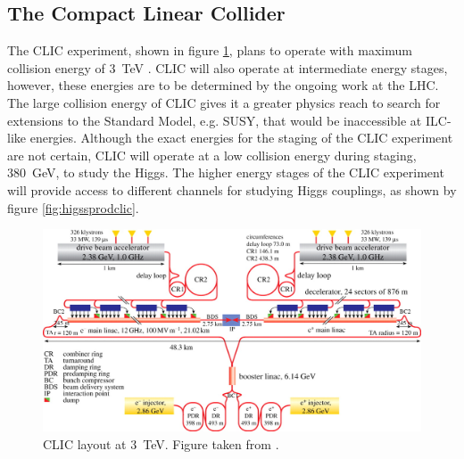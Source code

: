 
\subsection{The Compact Linear Collider}
The CLIC experiment, shown in figure \ref{fig:clic}, plans to operate with maximum collision energy of 3~TeV \cite{Linssen:2012hp, CLIC:2016zwp}.  CLIC will also operate at intermediate energy stages, however, these energies are to be determined by the ongoing work at the LHC.  The large collision energy of CLIC gives it a greater physics reach to search for extensions to the Standard Model, e.g. SUSY, that would be inaccessible at ILC-like energies.  Although the exact energies for the staging of the CLIC experiment are not certain, CLIC will operate at a low collision energy during staging, 380~GeV, to study the Higgs.  The higher energy stages of the CLIC experiment will provide access to different channels for studying Higgs couplings, as shown by figure \ref{fig:higssprodclic}.

\begin{figure}[h!]
\includegraphics[width=1.0\textwidth]{Introduction/Plots/CLIC.jpg}
\caption[CLIC layout at 3~TeV.  Figure taken from \cite{Aicheler:2012bya}.]{CLIC layout at 3~TeV.  Figure taken from \cite{Aicheler:2012bya}.}
\label{fig:clic}
\end{figure}

